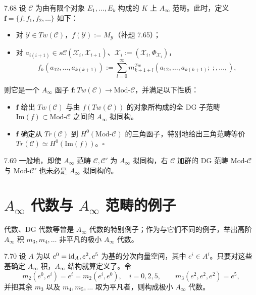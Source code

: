 \begin{corollary}{7.68}
设 $\mathcal C$ 为由有限个对象 $E_{1},\dots,E_{k}$ 构成的 $K$ 上 $A_\infty$ 范畴。此时，定义 $\mathbf f=\{f;f_{1},f_{2},\dots\}$ 如下：
\begin{itemize}[leftmargin=1.6em,itemsep=1pt,topsep=1pt]
  \item 对 $\mathcal Y\in Tw(\mathcal C)$，$f(\mathcal Y):=M_{\mathcal Y}$（补题 7.65）；
  \item 对 $a_{i(i+1)}\in s\mathcal C(\mathcal X_{i},\mathcal X_{i+1})$、$\mathcal X_{i}:=(\mathcal X_{i},\Phi_{\mathcal X_{i}})$，
  \[
    f_{k}(a_{12},\dots,a_{k(k+1)}):=\sum_{l=0}^{\infty}m_{k+1+l}^{Tw}(a_{12},\dots,a_{k(k+1)};\ ;,\dots,),
  \]
\end{itemize}
则它是一个 $A_\infty$ 函子 $\mathbf f\colon Tw(\mathcal C)\to\mathrm{Mod}\text{-}\mathcal C$，并满足以下性质：
\begin{itemize}[leftmargin=1.6em,itemsep=1pt,topsep=1pt]
  \item $\mathbf f$ 给出 $Tw(\mathcal C)$ 与由 $f(Tw(\mathcal C))$ 的对象所构成的全 DG 子范畴 $\mathrm{Im}(f)\subset\mathrm{Mod}\text{-}\mathcal C$ 之间的 $A_\infty$ 拟同构。
  \item $\mathbf f$ 确定从 $Tr(\mathcal C)$ 到 $H^{0}(\mathrm{Mod}\text{-}\mathcal C)$ 的三角函子，特别地给出三角范畴等价 $Tr(\mathcal C)\simeq H^{0}(\mathrm{Im}(f))$。\hfill$\square$
\end{itemize}
\end{corollary}

\begin{remark}{7.69}
一般地，即使 $A_\infty$ 范畴 $\mathcal C,\mathcal C'$ 为 $A_\infty$ 拟同构，右 $\mathcal C$ 加群的 DG 范畴 $\mathrm{Mod}\text{-}\mathcal C$ 与 $\mathrm{Mod}\text{-}\mathcal C'$ 也未必是 $A_\infty$ 拟同构的。
\end{remark}

\section{$A_\infty$ 代数与 $A_\infty$ 范畴的例子}

代数、DG 代数等曾是 $A_\infty$ 代数的特别例子；作为与它们不同的例子，举出高阶 $A_\infty$ 积 $m_{3},m_{4},\dots$ 非平凡的极小 $A_\infty$ 代数。

\begin{example}{7.70}
设 $A$ 为以 $e^{0}=\mathrm{id}_{A},e^{2},e^{5}$ 为基的分次向量空间，其中 $e^{i}\in A^{i}$。只要对这些基确定 $A_\infty$ 积，$A_\infty$ 结构就算定义了。令
\[
  m_{2}(e^{0},e^{i})=e^{i}=m_{2}(e^{i},e^{0}),\quad i=0,2,5,\qquad m_{3}(e^{2},e^{2},e^{2})=e^{5},
\]
并把其余 $m_{3}$ 以及 $m_{4},m_{5},\dots$ 取为平凡者，则构成极小 $A_\infty$ 代数。
\end{example}

